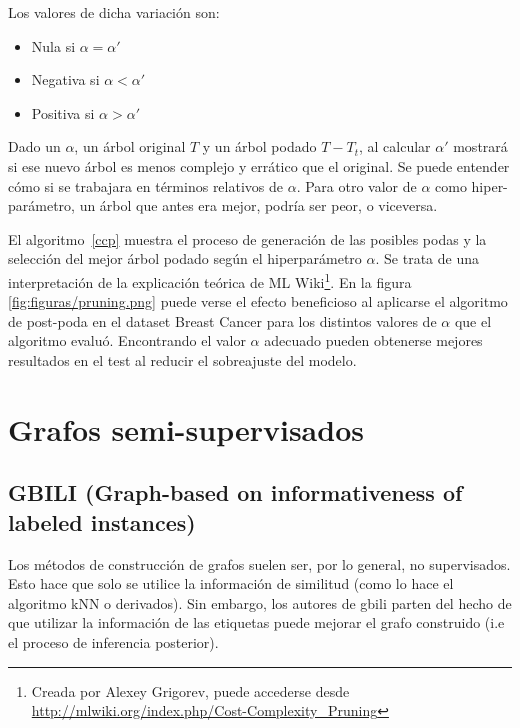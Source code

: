 Los valores de dicha variación son:

\begin{itemize}
    \item Nula si $\alpha = \alpha'$
    \item Negativa si $\alpha < \alpha'$
    \item Positiva si $\alpha > \alpha'$
\end{itemize}

Dado un $\alpha$, un árbol original $T$ y un árbol podado $T - T_t$, al calcular $\alpha'$ mostrará si ese nuevo árbol es menos complejo y errático que el original. Se puede entender cómo si se trabajara en términos relativos de $\alpha$. Para otro valor de $\alpha$ como hiper-parámetro, un árbol que antes era mejor, podría ser peor, o viceversa.

El algoritmo~\ref{ccp}  muestra el proceso de generación de las posibles podas y la selección del mejor árbol podado según el hiperparámetro $\alpha$. Se trata de una interpretación de la explicación teórica de ML Wiki\footnote{Creada por Alexey Grigorev, puede accederse desde \url{http://mlwiki.org/index.php/Cost-Complexity_Pruning}}. En la figura \ref{fig:figuras/pruning.png} puede verse el efecto beneficioso al aplicarse el algoritmo de post-poda en el dataset Breast Cancer para los distintos valores de $\alpha$ que el algoritmo evaluó. Encontrando el valor $\alpha$ adecuado pueden obtenerse mejores resultados en el test al reducir el sobreajuste del modelo.




\newpage
\section{Grafos semi-supervisados}

\subsection{GBILI (Graph-based on informativeness of labeled instances)}
\label{teoria-gbili}

Los métodos de construcción de grafos suelen ser, por lo general, no supervisados. Esto hace que solo se utilice la información de similitud (como lo hace el algoritmo kNN o derivados). Sin embargo, los autores de \Gls{gbili} \cite{berton2014graph} parten del hecho de que utilizar la información de las etiquetas puede mejorar el grafo construido (i.e el proceso de inferencia posterior).

